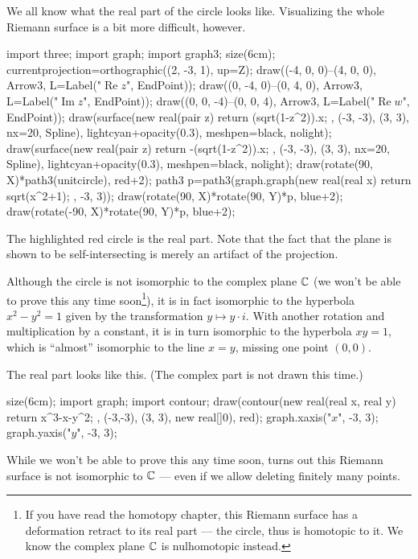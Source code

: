 \begin{example}
	We all know what the real part of the circle looks like. Visualizing the whole Riemann surface
	is a bit more difficult, however.
	\begin{center}
		\begin{asy}
			import three;
			import graph;
			import graph3;
			size(6cm);
			currentprojection=orthographic((2, -3, 1), up=Z);
			draw((-4, 0, 0)--(4, 0, 0), Arrow3, L=Label("$\operatorname{Re} z$", EndPoint));
			draw((0, -4, 0)--(0, 4, 0), Arrow3, L=Label("$\operatorname{Im} z$", EndPoint));
			draw((0, 0, -4)--(0, 0, 4), Arrow3, L=Label("$\operatorname{Re} w$", EndPoint));
			draw(surface(new real(pair z){ return (sqrt(1-z^2)).x; }, (-3, -3), (3, 3), nx=20, Spline),
			lightcyan+opacity(0.3), meshpen=black, nolight);
			draw(surface(new real(pair z){ return -(sqrt(1-z^2)).x; }, (-3, -3), (3, 3), nx=20, Spline),
			lightcyan+opacity(0.3), meshpen=black, nolight);
			draw(rotate(90, X)*path3(unitcircle), red+2);
			path3 p=path3(graph.graph(new real(real x){ return sqrt(x^2+1); }, -3, 3));
			draw(rotate(90, X)*rotate(90, Y)*p, blue+2);
			draw(rotate(-90, X)*rotate(90, Y)*p, blue+2);
		\end{asy}
	\end{center}
	The highlighted red circle is the real part.
	Note that the fact that the plane is shown to be self-intersecting is merely an artifact of the
	projection.

	Although the circle is not isomorphic to the complex plane $\mathbb C$ (we won't be able to prove this
	any time soon\footnote{%
	If you have read the homotopy chapter, this Riemann surface has a deformation retract to its
	real part --- the circle, thus is homotopic to it. We know the complex plane $\mathbb C$ is
	nulhomotopic instead.}),
	it is in fact isomorphic to the hyperbola $x^2-y^2 = 1$
	given by the transformation $y \mapsto y \cdot i$.
	With another rotation and multiplication by a constant,
	it is in turn isomorphic to the hyperbola $xy = 1$,
	which is ``almost'' isomorphic to the line $x = y$, missing one point $(0, 0)$.
\end{example}

\begin{example}[The elliptic curve $y^2 = x^3 - x$]
	The real part looks like this. (The complex part is not drawn this time.)
	\begin{center}
		\begin{asy}
			size(6cm);
			import graph;
			import contour;
			draw(contour(new real(real x, real y){ return x^3-x-y^2; }, (-3,-3), (3, 3),  new real[]{0}), red);
			graph.xaxis("$x$", -3, 3);
			graph.yaxis("$y$", -3, 3);
		\end{asy}
	\end{center}

	While we won't be able to prove this any time soon, turns out this Riemann surface is not
	isomorphic to $\mathbb C$ --- even if we allow deleting finitely many points.
\end{example}

